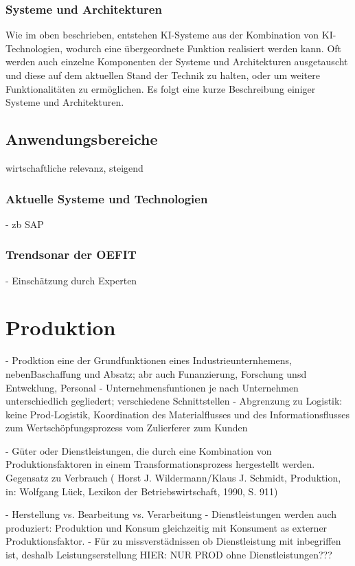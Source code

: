 \documentclass[a4paper,12pt, german]{report}
\begin{document}
\subsubsection{Systeme und Architekturen}
Wie im oben beschrieben, entstehen KI-Systeme aus der Kombination von KI-Technologien, wodurch eine übergeordnete Funktion realisiert werden kann. Oft werden auch einzelne Komponenten der Systeme und Architekturen ausgetauscht und diese auf dem aktuellen Stand der Technik zu halten, oder um weitere Funktionalitäten zu ermöglichen. Es folgt eine kurze Beschreibung einiger Systeme und Architekturen.

\subsection{Anwendungsbereiche}

wirtschaftliche relevanz, steigend

\subsubsection{Aktuelle Systeme und Technologien}
- zb SAP

\subsubsection{Trendsonar der OEFIT}

- Einschätzung durch Experten

\section{Produktion}

- Prodktion eine der Grundfunktionen eines Industrieunternhemens, nebenBaschaffung und Absatz; abr auch Funanzierung, Forschung unsd Entwcklung, Personal 
- Unternehmensfuntionen je nach Unternehmen unterschiedlich gegliedert; verschiedene Schnittstellen
- Abgrenzung zu Logistik: keine Prod-Logistik, Koordination des Materialflusses und des Informationsflusses zum Wertschöpfungsprozess vom Zulierferer zum Kunden
\cite{07}

- Güter oder Dienstleistungen, die durch eine Kombination von Produktionsfaktoren in einem Transformationsprozess hergestellt werden. Gegensatz zu Verbrauch ( Horst J. Wildermann/Klaus J. Schmidt, Produktion, in: Wolfgang Lück, Lexikon der Betriebswirtschaft, 1990, S. 911)

- Herstellung vs. Bearbeitung vs. Verarbeitung
- Dienstleistungen werden auch produziert: Produktion und Konsum gleichzeitig mit Konsument as externer Produktionsfaktor. 
- Für zu missverstädnissen ob Dienstleistung mit inbegriffen ist, deshalb Leistungserstellung
HIER: NUR PROD ohne Dienstleistungen???
\end{document}
